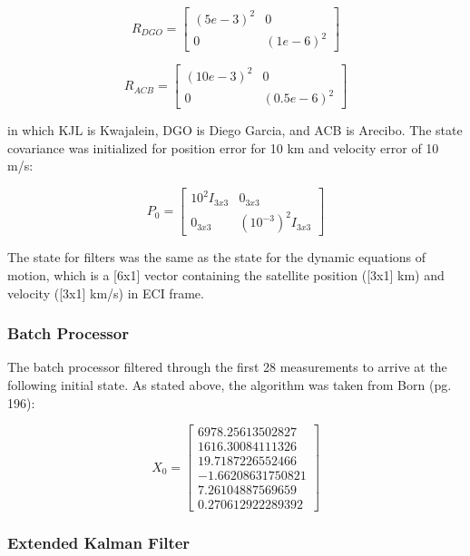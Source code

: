 \documentclass[conf]{new-aiaa}
\begin{document}
\begin{equation}
	R_{DGO} = 
	\begin{bmatrix}
		(5e-3)^2 & 0 \\ 
		0 & (1e-6)^2
	\end{bmatrix}
\end{equation}

\begin{equation}
	R_{ACB} = 
	\begin{bmatrix}
		(10e-3)^2 & 0 \\ 
		0 & (0.5e-6)^2
	\end{bmatrix}
\end{equation}

in which KJL is Kwajalein, DGO is Diego Garcia, and ACB is Arecibo. The state covariance was initialized for position error for 10 km and velocity error of 10 m/s: 

\begin{equation}
	P_0 = 
	\begin{bmatrix}
		10^2I_{3x3} & 0_{3x3} \\
		0_{3x3} & (10^{-3})^2I_{3x3} 
	\end{bmatrix}
\end{equation}

The state for filters was the same as the state for the dynamic equations of motion, which is a [6x1] vector containing the satellite position ([3x1] km) and velocity ([3x1] km/s) in ECI frame. 

\subsubsection{Batch Processor}

The batch processor filtered through the first 28 measurements to arrive at the following initial state. As stated above, the algorithm was taken from Born (pg. 196): 

\begin{equation}
	X_0 = 
	\begin{bmatrix}
		6978.25613502827 \\
		1616.30084111326 \\
		19.7187226552466 \\
		-1.66208631750821 \\
		7.26104887569659 \\
		0.270612922289392 
	\end{bmatrix}
\end{equation}

\subsubsection{Extended Kalman Filter}
\end{document}
